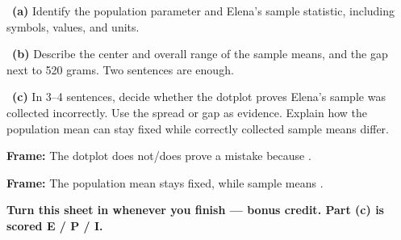 \documentclass[11pt]{article}
\begin{document}
~\textbf{(a)} Identify the population parameter and Elena's sample statistic, including symbols, values, and units.\par
\workspace{0.7in}

~\textbf{(b)} Describe the center and overall range of the sample means, and the gap next to 520 grams. Two sentences are enough.\par
\workspace{1.4in}

~\textbf{(c)} In 3--4 sentences, decide whether the dotplot proves Elena's sample was collected incorrectly. Use the spread or gap as evidence. Explain how the population mean can stay fixed while correctly collected sample means differ.\par
\workspace{2.0in}

\begin{sentenceframebox}\raggedright\textbf{Frame:} The dotplot does not/does prove a mistake because \blank[2.9in].\end{sentenceframebox}

\begin{sentenceframebox}\raggedright\textbf{Frame:} The population mean \blank[0.8in] stays fixed, while sample means \blank[2.6in].\end{sentenceframebox}

\textbf{Turn this sheet in whenever you finish --- bonus credit. Part (c) is scored E / P / I.}\par
\end{document}
